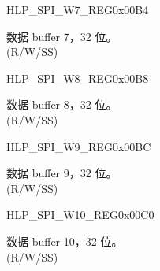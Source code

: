 \begin{register}{H}{LP\_SPI\_W7\_REG}{0x00B4}\label{regdesc:LPSPIW7REG}
%
\regnewline%
\begin{regdesc}\begin{reglist}
\label{fielddesc:LPSPIBUF7}\item [LP\_SPI\_BUF7] 数据 buffer 7，32 位。\\
(R/W/SS)
\end{reglist}\end{regdesc}
\end{register}


\begin{register}{H}{LP\_SPI\_W8\_REG}{0x00B8}\label{regdesc:LPSPIW8REG}
%
\regnewline%
\begin{regdesc}\begin{reglist}
\label{fielddesc:LPSPIBUF8}\item [LP\_SPI\_BUF8] 数据 buffer 8，32 位。\\
(R/W/SS)
\end{reglist}\end{regdesc}
\end{register}


\begin{register}{H}{LP\_SPI\_W9\_REG}{0x00BC}\label{regdesc:LPSPIW9REG}
%
\regnewline%
\begin{regdesc}\begin{reglist}
\label{fielddesc:LPSPIBUF9}\item [LP\_SPI\_BUF9] 数据 buffer 9，32 位。\\
(R/W/SS)
\end{reglist}\end{regdesc}
\end{register}


\begin{register}{H}{LP\_SPI\_W10\_REG}{0x00C0}\label{regdesc:LPSPIW10REG}
%
\regnewline%
\begin{regdesc}\begin{reglist}
\label{fielddesc:LPSPIBUF10}\item [LP\_SPI\_BUF10] 数据 buffer 10，32 位。\\
(R/W/SS)
\end{reglist}\end{regdesc}
\end{register}


